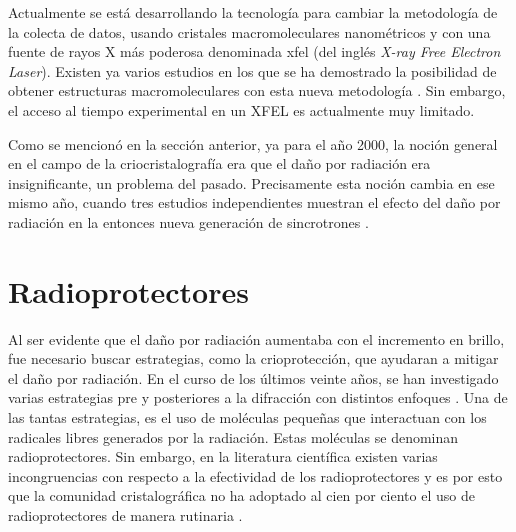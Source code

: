 Actualmente se está desarrollando la tecnología para cambiar la metodología de la colecta de datos, usando cristales macromoleculares nanométricos y con una fuente de rayos X más poderosa denominada \acrshort{xfel} (del inglés \emph{X-ray Free Electron Laser}). Existen ya varios estudios en los que se ha demostrado la posibilidad de obtener estructuras macromoleculares con esta nueva metodología . Sin embargo, el acceso al tiempo experimental en un XFEL es actualmente muy limitado.

Como se mencionó en la sección anterior, ya para el año 2000, la noción general en el campo de la criocristalografía era que el daño por radiación era insignificante, un problema del pasado. Precisamente esta noción cambia en ese mismo año, cuando tres estudios independientes muestran el efecto del daño por radiación en la entonces nueva generación de sincrotrones . 

\section{Radioprotectores}
Al ser evidente que el daño por radiación aumentaba con el incremento en brillo, fue necesario buscar estrategias, como la crioprotección, que ayudaran a mitigar el daño por radiación. En el curso de los últimos veinte años, se han investigado varias estrategias pre y posteriores a la difracción con distintos enfoques . Una de las tantas estrategias, es el uso de moléculas pequeñas que interactuan con los radicales libres generados por la radiación. Estas moléculas se denominan radioprotectores. Sin embargo, en la literatura científica existen varias incongruencias con respecto a la efectividad de los radioprotectores y es por esto que la comunidad cristalográfica no ha adoptado al cien por ciento el uso de radioprotectores de manera rutinaria .
